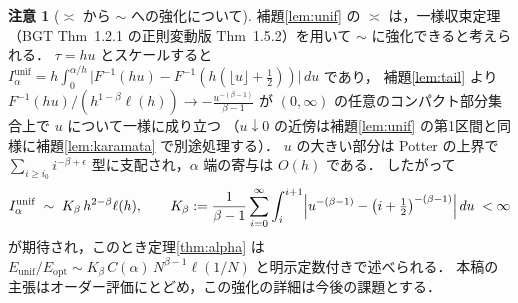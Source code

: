\documentclass[a4paper,10pt]{jsarticle}
\theoremstyle{definition}
\newtheorem{remark}{注意}[section]
\newcommand{\Finv}{F^{-1}}
\newcommand{\Eunif}{E_{\mathrm{unif}}}
\newcommand{\Eopt}{E_{\mathrm{opt}}}
\newcommand{\Iunif}{I_\alpha^{\mathrm{unif}}}
\begin{document}
\begin{remark}[$\asymp$ から $\sim$ への強化について]
\label{rem:sharp}
補題\ref{lem:unif} の $\asymp$ は，一様収束定理（BGT Thm~1.2.1 の正則変動版 Thm~1.5.2）を用いて $\sim$ に強化できると考えられる．
$\tau=hu$ とスケールすると $\Iunif=h\int_0^{\alpha/h}\bigl|\Finv(hu)-\Finv(h(\lfloor u\rfloor+\frac12))\bigr|\,du$ であり，
補題\ref{lem:tail} より $\Finv(hu)/(h^{1-\beta}\ell(h))\to-\frac{u^{-(\beta-1)}}{\beta-1}$ が $(0,\infty)$ の任意のコンパクト部分集合上で $u$ について一様に成り立つ
（$u\downarrow0$ の近傍は補題\ref{lem:unif} の第1区間と同様に補題\ref{lem:karamata} で別途処理する）．
$u$ の大きい部分は Potter の上界で $\sum_{i\ge i_0}i^{-\beta+\epsilon}$ 型に支配され，$\alpha$ 端の寄与は $O(h)$ である．
したがって
\begin{equation*}
 \Iunif\;\sim\;K_\beta\,h^{2-\beta}\ell(h),\qquad
 K_\beta:=\frac1{\beta-1}\sum_{i=0}^{\infty}\int_i^{i+1}\Bigl|u^{-(\beta-1)}-\bigl(i+\tfrac12\bigr)^{-(\beta-1)}\Bigr|\,du\;<\infty
\end{equation*}
が期待され，このとき定理\ref{thm:alpha} は $\Eunif/\Eopt\sim K_\beta\,C(\alpha)\,N^{\beta-1}\ell(1/N)$ と明示定数付きで述べられる．
本稿の主張はオーダー評価にとどめ，この強化の詳細は今後の課題とする．
\end{remark}
\end{document}
